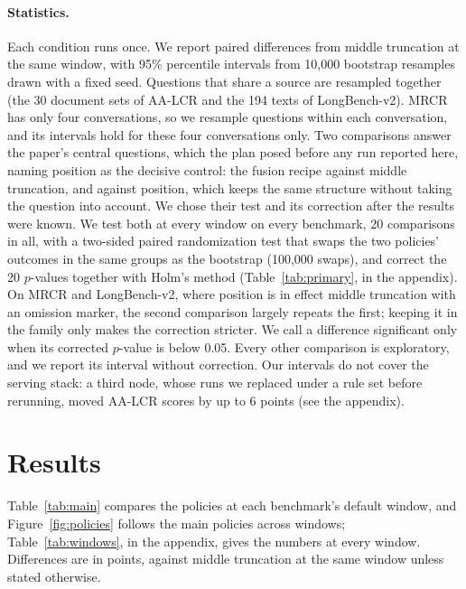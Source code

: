 \documentclass[letterpaper]{article} %
\newcommand{\recipe}{fusion recipe}
\begin{document}
\paragraph{Statistics.} Each condition runs once. We report paired differences from middle truncation at the same window, with 95\% percentile intervals from 10,000 bootstrap resamples drawn with a fixed seed. Questions that share a source are resampled together (the 30 document sets of AA-LCR and the 194 texts of LongBench-v2). MRCR has only four conversations, so we resample questions within each conversation, and its intervals hold for these four conversations only. Two comparisons answer the paper's central questions, which the plan posed before any run reported here, naming position as the decisive control: the \recipe{} against middle truncation, and against position, which keeps the same structure without taking the question into account. We chose their test and its correction after the results were known. We test both at every window on every benchmark, 20 comparisons in all, with a two-sided paired randomization test that swaps the two policies' outcomes in the same groups as the bootstrap (100,000 swaps), and correct the 20 $p$-values together with Holm's method (Table~\ref{tab:primary}, in the appendix). On MRCR and LongBench-v2, where position is in effect middle truncation with an omission marker, the second comparison largely repeats the first; keeping it in the family only makes the correction stricter. We call a difference significant only when its corrected $p$-value is below 0.05. Every other comparison is exploratory, and we report its interval without correction. Our intervals do not cover the serving stack: a third node, whose runs we replaced under a rule set before rerunning, moved AA-LCR scores by up to 6 points (see the appendix).
\section{Results}
Table~\ref{tab:main} compares the policies at each benchmark's default window, and Figure~\ref{fig:policies} follows the main policies across windows; Table~\ref{tab:windows}, in the appendix, gives the numbers at every window. Differences are in points, against middle truncation at the same window unless stated otherwise.
\end{document}
